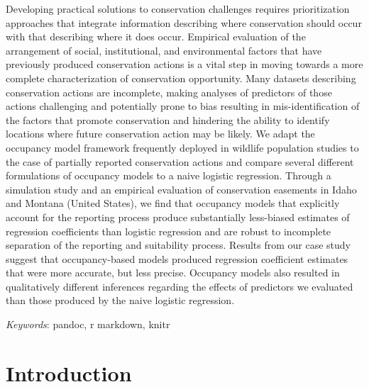 \documentclass[11pt,]{article}
\renewenvironment{abstract}
 {{%
    \setlength{\leftmargin}{0mm}
    \setlength{\rightmargin}{\leftmargin}%
  }%
  \relax}
 {\endlist}
\begin{document}
\begin{abstract}

    \hbox{\vrule height .2pt width 39.14pc}

    \vskip 8.5pt %

\noindent Developing practical solutions to conservation challenges requires
prioritization approaches that integrate information describing where
conservation should occur with that describing where it does occur.
Empirical evaluation of the arrangement of social, institutional, and
environmental factors that have previously produced conservation actions
is a vital step in moving towards a more complete characterization of
conservation opportunity. Many datasets describing conservation actions
are incomplete, making analyses of predictors of those actions
challenging and potentially prone to bias resulting in
mis-identification of the factors that promote conservation and
hindering the ability to identify locations where future conservation
action may be likely. We adapt the occupancy model framework frequently
deployed in wildlife population studies to the case of partially
reported conservation actions and compare several different formulations
of occupancy models to a naive logistic regression. Through a simulation
study and an empirical evaluation of conservation easements in Idaho and
Montana (United States), we find that occupancy models that explicitly
account for the reporting process produce substantially less-biased
estimates of regression coefficients than logistic regression and are
robust to incomplete separation of the reporting and suitability
process. Results from our case study suggest that occupancy-based models
produced regression coefficient estimates that were more accurate, but
less precise. Occupancy models also resulted in qualitatively different
inferences regarding the effects of predictors we evaluated than those
produced by the naive logistic regression.


\vskip 8.5pt \noindent \emph{Keywords}: pandoc, r markdown, knitr \par

    \hbox{\vrule height .2pt width 39.14pc}



\end{abstract}


\vskip -8.5pt



\noindent  

\hypertarget{introduction}{%
\section{Introduction}\label{introduction}}
\end{document}
